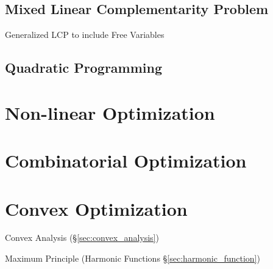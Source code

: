 \subsection{Mixed Linear Complementarity Problem}\label{sec:mlcp}

Generalized LCP to include Free Variables



\subsection{Quadratic Programming}\label{sec:quadratic_programming}



\section{Non-linear Optimization}\label{sec:nonlinear_optimization}

\section{Combinatorial Optimization}
\label{sec:combinatorial_optimization}

\section{Convex Optimization}\label{sec:convex_optimization}

Convex Analysis (\S\ref{sec:convex_analysis})

Maximum Principle (Harmonic Functions \S\ref{sec:harmonic_function})

